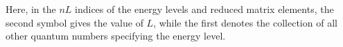 Here, in the $nL$ indices of the energy levels and reduced matrix elements, the second symbol gives the value of $L$, while the first denotes the collection of all other quantum numbers specifying the energy level.
